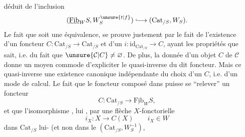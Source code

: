 
déduit de l'inclusion
\[
(\underline{\mathrm{Fib}}_W S,W_S^{\unsure{t|f}})\lhook\joinrel\longrightarrow(\mathrm{Cat}_{/S},W_S).
\]
Le fait que  soit une équivalence, se prouve justement par le fait de l'existence d'un foncteur $C:\mathrm{Cat}_{/S}\to\mathrm{Cat}_{/S}$ et d'un $i:\mathrm{id}_{\mathrm{Cat}_{/S}}\to C$, ayant les propriétés que  sait, i.e. du fait que $\unsure{\mathcal{C}|C}\ne\varnothing$. De plus, la donnée d'un objet $C$ de $\mathcal{C}$ donne un moyen commode d'expliciter le quasi-inverse du dit foncteur. Mais ce quasi-inverse  une existence canonique  indépendante du choix d'un $C$, i.e. d'un mode de calcul. Le fait que le foncteur composé \inserted{$\unsure{\varphi|\phi}$} dans  puisse se ``relever''   un foncteur
\[
C:\mathrm{Cat}_{/S}\longrightarrow\underline{\mathrm{Fib}}_W S,
\]
et que l'isomorphisme   , lui , par une flèche $X$-fonctorielle
\[
i_X:X\longrightarrow C(X)\qquad i_X\in W
\]
dans $\mathrm{Cat}_{/S}$ lui- (et non  dans le  $(\mathrm{Cat}_{/S},W_S^{-1})$,

